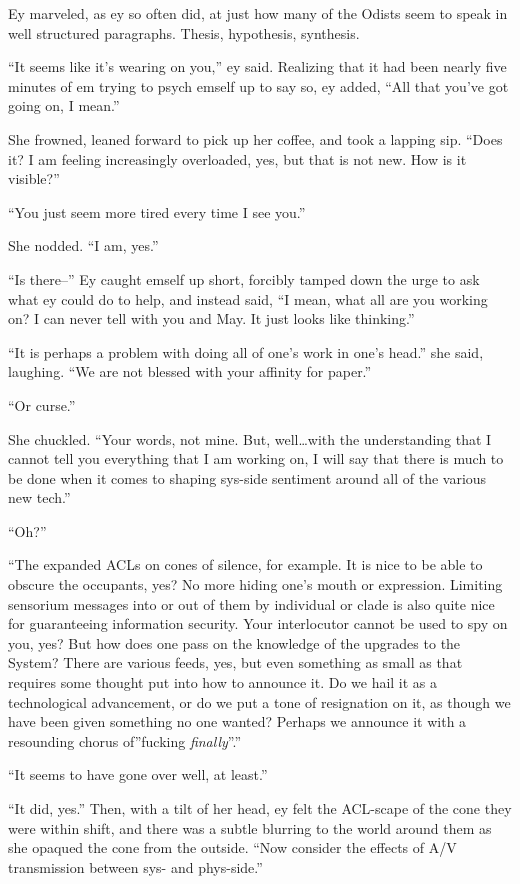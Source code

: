Ey marveled, as ey so often did, at just how many of the Odists seem to speak in well structured paragraphs. Thesis, hypothesis, synthesis.

``It seems like it's wearing on you,'' ey said. Realizing that it had been nearly five minutes of em trying to psych emself up to say so, ey added, ``All that you've got going on, I mean.''

She frowned, leaned forward to pick up her coffee, and took a lapping sip. ``Does it? I am feeling increasingly overloaded, yes, but that is not new. How is it visible?''

``You just seem more tired every time I see you.''

She nodded. ``I am, yes.''

``Is there--'' Ey caught emself up short, forcibly tamped down the urge to ask what ey could do to help, and instead said, ``I mean, what all are you working on? I can never tell with you and May. It just looks like thinking.''

``It is perhaps a problem with doing all of one's work in one's head.'' she said, laughing. ``We are not blessed with your affinity for paper.''

``Or curse.''

She chuckled. ``Your words, not mine. But, well\ldots with the understanding that I cannot tell you everything that I am working on, I will say that there is much to be done when it comes to shaping sys-side sentiment around all of the various new tech.''

``Oh?''

``The expanded ACLs on cones of silence, for example. It is nice to be able to obscure the occupants, yes? No more hiding one's mouth or expression. Limiting sensorium messages into or out of them by individual or clade is also quite nice for guaranteeing information security. Your interlocutor cannot be used to spy on you, yes? But how does one pass on the knowledge of the upgrades to the System? There are various feeds, yes, but even something as small as that requires some thought put into how to announce it. Do we hail it as a technological advancement, or do we put a tone of resignation on it, as though we have been given something no one wanted? Perhaps we announce it with a resounding chorus of''fucking \emph{finally}''.''

``It seems to have gone over well, at least.''

``It did, yes.'' Then, with a tilt of her head, ey felt the ACL-scape of the cone they were within shift, and there was a subtle blurring to the world around them as she opaqued the cone from the outside. ``Now consider the effects of A/V transmission between sys- and phys-side.''

